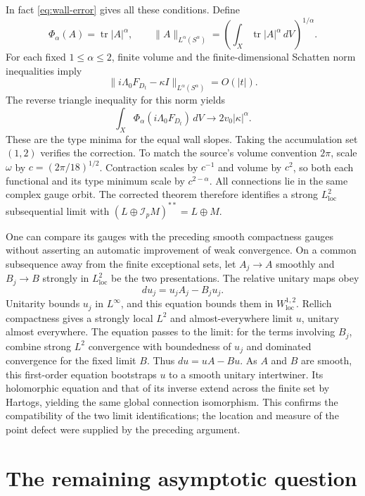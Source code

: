 \documentclass[11pt]{amsart}
\theoremstyle{definition}
\theoremstyle{remark}
\newcommand{\cI}{\mathcal I}
\newcommand{\tr}{\operatorname{tr}}
\begin{document}
In fact \eqref{eq:wall-error} gives all these conditions. Define
\[
 \Phi_\alpha(A)=\tr|A|^\alpha,\qquad
 \|A\|_{L^\alpha(S^\alpha)}
     =\left(\int_X\tr|A|^\alpha\,dV\right)^{1/\alpha}.
\]
For each fixed $1\le\alpha\le2$, finite volume and the finite-dimensional
Schatten norm inequalities imply
\[
 \|i\Lambda_0F_{D_t}-\kappa I\|_{L^\alpha(S^\alpha)}=O(|t|).
\]
The reverse triangle inequality for this norm yields
\begin{equation}\label{eq:all-alpha}
 \int_X\Phi_\alpha(i\Lambda_0F_{D_t})\,dV
       \longrightarrow2v_0|\kappa|^\alpha.
\end{equation}
These are the type minima for the equal wall slopes. Taking the
accumulation set $(1,2)$ verifies the correction. To match the source's
volume convention $2\pi$, scale $\omega$ by
$c=(2\pi/18)^{1/2}$. Contraction scales by $c^{-1}$ and volume by $c^2$,
so both each functional and its type minimum scale by $c^{2-\alpha}$.
All connections lie in the same complex gauge orbit. The corrected
theorem therefore identifies a strong $L^2_{\mathrm{loc}}$ subsequential limit
with $(L\oplus\cI_pM)^{**}=L\oplus M$.

One can compare its gauges with the preceding smooth compactness gauges
without asserting an automatic improvement of weak convergence.
On a common subsequence away from the finite exceptional sets, let
$A_j\to A$ smoothly and $B_j\to B$ strongly in $L^2_{\mathrm{loc}}$
be the two presentations. The relative unitary maps obey
\[
 du_j=u_jA_j-B_ju_j.
\]
Unitarity bounds $u_j$ in $L^\infty$, and this equation bounds them
in $W^{1,2}_{\mathrm{loc}}$. Rellich compactness gives a strongly local
$L^2$ and almost-everywhere limit $u$, unitary almost everywhere.
The equation passes to the limit: for the terms involving $B_j$, combine
strong $L^2$ convergence with boundedness of $u_j$ and dominated convergence
for the fixed limit $B$. Thus $du=uA-Bu$. As $A$ and $B$ are smooth,
this first-order equation bootstraps $u$ to a smooth unitary intertwiner.
Its holomorphic equation and that of its inverse extend across the finite
set by Hartogs, yielding the same global connection isomorphism.
This confirms the compatibility of the two limit identifications; the
location and measure of the point defect were supplied by the preceding
argument.

\section{The remaining asymptotic question}\label{sec:questions}
\end{document}
